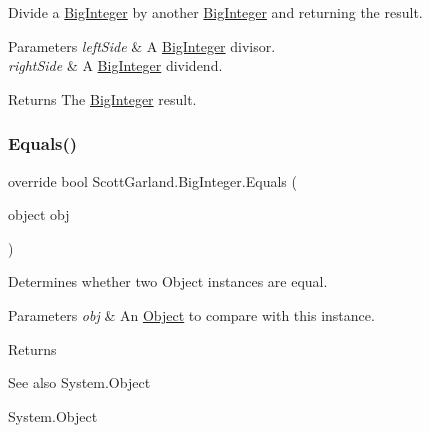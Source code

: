 Divide a \hyperlink{class_scott_garland_1_1_big_integer}{Big\+Integer} by another \hyperlink{class_scott_garland_1_1_big_integer}{Big\+Integer} and returning the result. 


\begin{DoxyParams}{Parameters}
{\em left\+Side} & A \hyperlink{class_scott_garland_1_1_big_integer}{Big\+Integer} divisor.\\
\hline
{\em right\+Side} & A \hyperlink{class_scott_garland_1_1_big_integer}{Big\+Integer} dividend.\\
\hline
\end{DoxyParams}
\begin{DoxyReturn}{Returns}
The \hyperlink{class_scott_garland_1_1_big_integer}{Big\+Integer} result.
\end{DoxyReturn}
\mbox{\label{class_scott_garland_1_1_big_integer_a1d708cffb8ea8f6667cf69dfd60e41d1}} 
\subsubsection{\texorpdfstring{Equals()}{Equals()}}
{\footnotesize\ttfamily override bool Scott\+Garland.\+Big\+Integer.\+Equals (\begin{DoxyParamCaption}\item[{object}]{obj }\end{DoxyParamCaption})\hspace{0.3cm}{\ttfamily [inline]}}



Determines whether two Object instances are equal. 


\begin{DoxyParams}{Parameters}
{\em obj} & An \hyperlink{}{Object} to compare with this instance.\\
\hline
\end{DoxyParams}
\begin{DoxyReturn}{Returns}

\end{DoxyReturn}
\begin{DoxySeeAlso}{See also}
System.\+Object


\end{DoxySeeAlso}
System.\+Object\mbox{\label{class_scott_garland_1_1_big_integer_a8437c07ab30cda55c559bf17f4466ead}} 
